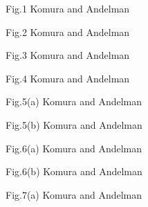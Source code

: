 
\newpage
\begin{figure}[tbh]
\epsfxsize=17cm
\centerline{\vbox{}}
\end{figure}
\vskip 4cm
 {\LARGE Fig.1  Komura and Andelman}

\newpage
\begin{figure}[tbh]
\epsfxsize=17cm
\centerline{\vbox{}}
\end{figure}
\vskip 4cm {\LARGE Fig.2  Komura and Andelman}

\newpage
\begin{figure}[tbh]
\epsfxsize=17cm
\centerline{\vbox{}}
\end{figure}
\vskip 4cm
{\LARGE Fig.3  Komura and Andelman}

\newpage
\begin{figure}[tbh]
\epsfxsize=17cm
\centerline{\vbox{}}
\end{figure}
\vskip 4cm
{\LARGE Fig.4  Komura and Andelman}

\newpage
\begin{figure}[tbh]
\epsfxsize=17cm
\centerline{\vbox{}}
\end{figure}
\vskip 4cm
{\LARGE Fig.5(a)  Komura and Andelman}

\newpage
\begin{figure}[tbh]
\epsfxsize=17cm
\centerline{\vbox{}}
\end{figure}
\vskip 4cm
{\LARGE Fig.5(b)  Komura and Andelman}

\newpage
\begin{figure}[tbh]
\epsfxsize=17cm
\centerline{\vbox{}}
\end{figure}
\vskip 4cm
{\LARGE Fig.6(a)  Komura and Andelman}

\newpage
\begin{figure}[tbh]
\epsfxsize=17cm
\centerline{\vbox{}}
\end{figure}
\vskip 4cm
{\LARGE Fig.6(b)  Komura and Andelman}

\newpage
\begin{figure}[tbh]
\epsfxsize=17cm
\centerline{\vbox{}}
\end{figure}
\vskip 4cm
{\LARGE Fig.7(a)  Komura and Andelman}

